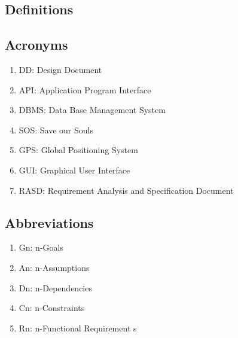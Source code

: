 \subsection{Definitions}
\begin{enumerate}
\end{enumerate}

\subsection{Acronyms}
\begin{enumerate}
\item DD: Design Document
\item API: Application Program Interface
\item DBMS: Data Base Management System
\item SOS: Save our Souls
\item GPS: Global Positioning System
\item GUI: Graphical User Interface
\item RASD: Requirement Analysis and Specification Document
\end{enumerate}

\subsection{Abbreviations}
\begin{enumerate}
\item Gn: n-Goals
\item An: n-Assumptions
\item Dn: n-Dependencies
\item Cn: n-Constraints
\item Rn: n-Functional Requirement s
\end{enumerate}
